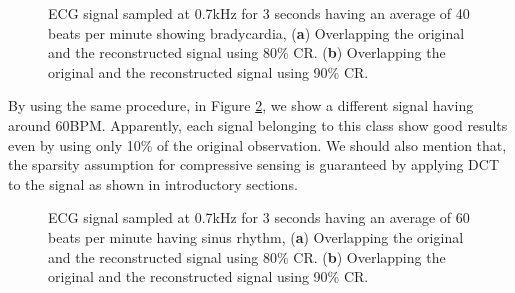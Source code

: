 \documentclass[journal,article,submit,electronics,pdftex]{Definitions/mdpi}
\begin{document}
{\begin{figure}[H]
\centering
\hspace*{\fill}
%
\hspace*{\fill}
%
\hspace*{\fill}
\caption{ECG signal sampled at 0.7kHz for 3 seconds having an average of 40 beats per minute showing bradycardia, (\textbf{a}) Overlapping the original and the reconstructed signal using 80\% CR. 
(\textbf{b}) Overlapping the original and the reconstructed signal using 90\% CR.}
\label{fig:bradycardia}
\end{figure}

By using the same procedure, in Figure \ref{fig:sinus}, we show a different signal having around 60BPM. Apparently, each signal belonging to this class show good results even by using only 10\% of the original observation. We should also mention that, the sparsity assumption for compressive sensing is guaranteed by applying DCT to the signal as shown in introductory sections.

\begin{figure}[H]
\centering
\hspace*{\fill}
%
\hspace*{\fill}
%
\hspace*{\fill}
\caption{ECG signal sampled at 0.7kHz for 3 seconds having an average of 60 beats per minute having sinus rhythm, (\textbf{a}) Overlapping the original and the reconstructed signal using 80\% CR. 
(\textbf{b}) Overlapping the original and the reconstructed signal using 90\% CR.}
\label{fig:sinus}
\end{figure}

}
\end{document}

